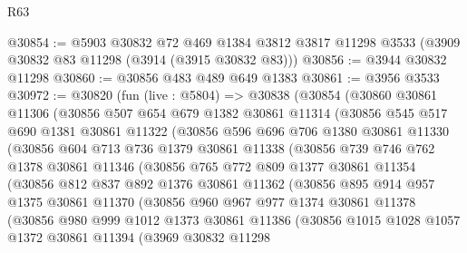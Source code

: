 \begin{lexlean}{R63}
\begin{coremodule}
@30854 := @5903
    @30832
    @72
    @469
    @1384
    @3812
    @3817
    @11298
    @3533
    (@3909 @30832 @83 @11298 (@3914 (@3915 @30832 @83)))
@30856 := @3944 @30832 @11298
@30860 := @30856 @483 @489 @649 @1383
@30861 := @3956 @3533
@30972 := @30820
    (fun (live : @5804) =>
    @30838
      (@30854
        (@30860
          @30861
          @11306
          (@30856
            @507
            @654
            @679
            @1382
            @30861
            @11314
            (@30856
              @545
              @517
              @690
              @1381
              @30861
              @11322
              (@30856
                @596
                @696
                @706
                @1380
                @30861
                @11330
                (@30856
                  @604
                  @713
                  @736
                  @1379
                  @30861
                  @11338
                  (@30856
                    @739
                    @746
                    @762
                    @1378
                    @30861
                    @11346
                    (@30856
                      @765
                      @772
                      @809
                      @1377
                      @30861
                      @11354
                      (@30856
                        @812
                        @837
                        @892
                        @1376
                        @30861
                        @11362
                        (@30856
                          @895
                          @914
                          @957
                          @1375
                          @30861
                          @11370
                          (@30856
                            @960
                            @967
                            @977
                            @1374
                            @30861
                            @11378
                            (@30856
                              @980
                              @999
                              @1012
                              @1373
                              @30861
                              @11386
                              (@30856
                                @1015
                                @1028
                                @1057
                                @1372
                                @30861
                                @11394
                                (@3969
                                  @30832
                                  @11298

\end{coremodule}
\end{lexlean}
